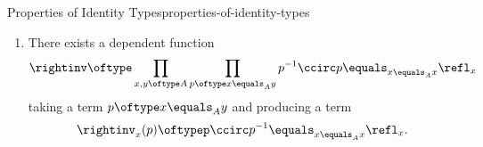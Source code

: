 \begin{proposition}{Properties of Identity Types}{properties-of-identity-types}
\begin{enumerate}
\[            \]%
            taking a term $p\oftype x\equals_{A}y$ and producing a term
            \[
                \leftinv_{x}(p)%
                \oftype%
                p^{-1}\ccirc p\equals_{y\equals_{A}y}\refl_{y}.%
            \]%
        \item\label{properties-of-identity-types-right-invertibility}There exists a dependent function
            \[
                \rightinv%
                \oftype%
                \prod_{x,y\oftype A}\prod_{p\oftype x\equals_{A}y}p^{-1}\ccirc p\equals_{x\equals_{A}x}\refl_{x}
            \]%
            taking a term $p\oftype x\equals_{A}y$ and producing a term
            \[
                \rightinv_{x}(p)%
                \oftype%
                p\ccirc p^{-1}\equals_{x\equals_{A}x}\refl_{x}.%
            \]%
    \end{enumerate}
\end{proposition}
